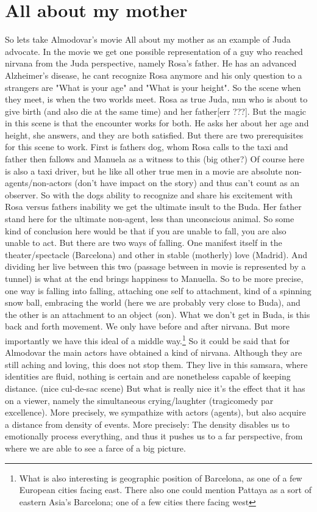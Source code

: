 \documentclass[10pt]{book}
\begin{document}
\section{All about my mother}
So lets take Almodovar's movie All about my mother as an example of Juda advocate. In the movie we get one possible representation of a guy who reached nirvana from the Juda perspective, namely Rosa's father. He has an advanced Alzheimer's disease, he cant recognize Rosa anymore and his only question to a strangers are "What is your age" and "What is your height". So the scene when they meet, is when the two worlds meet. Rosa as true Juda, nun who is about to give birth (and also die at the same time) and her father[err ???]. But the magic in this scene is that the encounter works for both. He asks her about her age and height, she answers, and they are both satisfied. But there are two prerequisites for this scene to work. First is fathers dog, whom Rosa calls to the taxi and father then fallows and Manuela as a witness to this (big other?) Of course here is also a taxi driver, but he like all other true men in a movie are absolute non-agents/non-actors (don't have impact on the story) and thus can't count as an observer. So with the dogs ability to recognize and share his excitement with Rosa versus fathers inability we get the ultimate insult to the Buda. Her father stand here for the ultimate non-agent, less than unconscious animal. 
So some kind of conclusion here would be that if you are unable to fall, you are also unable to act. But there are two ways of falling. One manifest itself in the theater/spectacle (Barcelona) and other in stable (motherly) love (Madrid). And dividing her live between this two (passage between in movie is represented by a tunnel) is what at the end brings happiness to Manuella. So to be more precise, one way is falling into falling, attaching one self to attachment, kind of a spinning snow ball, embracing the world (here we are probably very close to Buda), and the other is an attachment to an object (son). What we don't get in Buda, is this back and forth movement. We only have before and after nirvana. But more importantly we have this ideal of a middle way.\footnote{What is also interesting is geographic position of Barcelona, as one of a few European cities facing east. There also one could mention Pattaya as a sort of eastern Asia's Barcelona; one of a few cities there facing west}
So it could be said that for Almodovar the main actors have obtained a kind of nirvana. Although they are still aching and loving, this does not stop them. They live in this samsara, where identities are fluid, nothing is certain and are nonetheless capable of keeping distance. (nice cul-de-sac scene) But what is really nice it's the effect that it has on a viewer, namely the simultaneous crying/laughter (tragicomedy par excellence). More precisely, we sympathize with actors (agents), but also acquire a distance from density of events. More precisely: The density disables us to emotionally process everything, and thus it pushes us to a far perspective, from where we are able to see a farce of a big picture.
\end{document}
